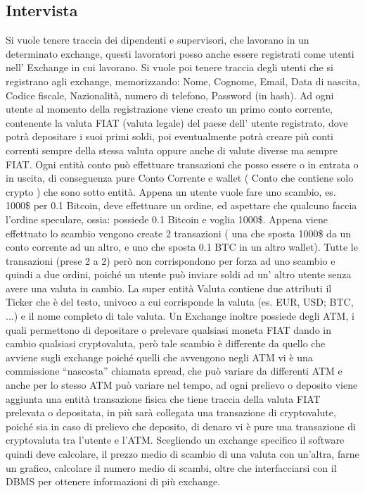 \documentclass{article}
\begin{document}
\subsection{Intervista}
Si vuole tenere traccia dei dipendenti e supervisori, che lavorano in un determinato exchange, questi lavoratori posso anche essere registrati come utenti nell’ Exchange in cui lavorano.
Si vuole poi tenere traccia degli utenti che si registrano agli exchange, memorizzando: Nome, Cognome, Email, Data di nascita, Codice fiscale, Nazionalità, numero di telefono, Password (in hash). Ad ogni utente al momento della registrazione viene creato un primo conto corrente, contenente la valuta FIAT (valuta legale) del paese dell’ utente registrato, dove potrà depositare i suoi primi soldi, poi eventualmente potrà creare più conti correnti sempre della stessa valuta oppure anche di valute diverse ma sempre FIAT. Ogni entità conto può effettuare transazioni che posso essere o in entrata o in uscita, di conseguenza pure Conto Corrente e wallet ( Conto che contiene solo crypto ) che sono sotto entità. Appena un utente vuole fare uno scambio, es. 1000\$ per 0.1 Bitcoin, deve effettuare un ordine, ed aspettare che qualcuno faccia l’ordine speculare, ossia: possiede 0.1 Bitcoin e voglia 1000\$. Appena viene effettuato lo scambio vengono create 2 transazioni ( una che sposta 1000\$ da un conto corrente ad un altro, e uno che sposta 0.1 BTC in un altro wallet). Tutte le transazioni (prese 2 a 2) però non corrispondono per forza ad uno scambio e quindi a due ordini, poiché un utente può inviare soldi ad un’ altro utente senza avere una valuta in cambio. La super entità Valuta contiene due attributi il Ticker che è del testo, univoco a cui corrisponde la valuta (es. EUR, USD; BTC, ...) e il nome completo di tale valuta. Un Exchange inoltre possiede degli ATM, i quali permettono di depositare o prelevare qualsiasi moneta FIAT dando in cambio qualsiasi cryptovaluta, però tale scambio è differente da quello che avviene sugli exchange poiché quelli che avvengono negli ATM vi è una commissione “nascosta” chiamata spread, che può variare da differenti ATM e anche per lo stesso ATM può variare nel tempo, ad ogni prelievo o deposito viene aggiunta una entità transazione fisica che tiene traccia della valuta FIAT prelevata o depositata, in più sarà collegata una transazione di cryptovalute, poiché sia in caso di prelievo che deposito, di denaro vi è pure una transazione di cryptovaluta tra l’utente e l’ATM. Scegliendo un exchange specifico il software quindi deve calcolare, il prezzo medio di scambio di una valuta con un’altra, farne un grafico, calcolare il numero medio di scambi, oltre che interfacciarsi con il DBMS per ottenere informazioni di più exchange.
\newpage
\end{document}
